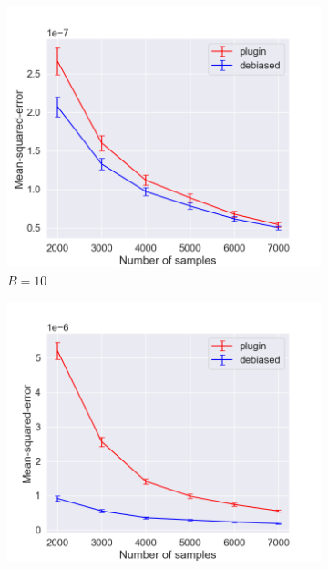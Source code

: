 \begin{figure}
  \centering
  \centering
     \begin{subfigure}[b]{0.45\textwidth}
         \centering
         \includegraphics[width=\textwidth]{images/mse_estimator_10_bins.png}
         \caption{$B = 10$
         }
         \label{fig:mse_estimators}
     \end{subfigure}
     \hfill
     \begin{subfigure}[b]{0.45\textwidth}
         \centering
         \includegraphics[width=\textwidth]{images/mse_estimator_100_bins.png}

\end{subfigure}
\end{figure}
